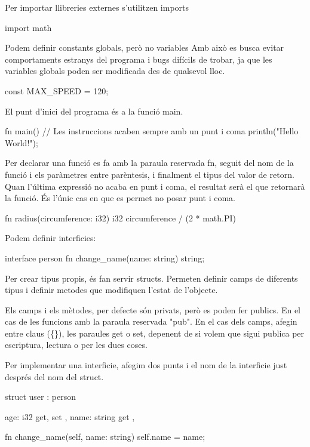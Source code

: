 ﻿\documentclass{article}
\begin{document}
Per importar llibreries externes s'utilitzen imports

\begin{code}
import math
\end{code}

Podem definir constants globals, però no variables
Amb això es busca evitar comportaments estranys del programa i bugs difícils
de trobar, ja que les variables globals poden ser modificada des de qualsevol
lloc.

\begin{code}
const MAX_SPEED = 120;
\end{code}

El punt d'inici del programa és a la funció main.

\begin{code}
fn main() {
    // Les instruccions acaben sempre amb un punt i coma
    println("Hello World!");
}
\end{code}

Per declarar una funció es fa amb la paraula reservada fn, seguit del nom de la 
funció i els paràmetres entre parèntesis, i finalment el tipus del valor de retorn.
Quan l'última expressió no acaba en punt i coma, el resultat serà el que retornarà
la funció. És l'únic cas en que es permet no posar punt i coma.

\begin{code}
fn radius(circumference: i32) i32 {
    circumference / (2 * math.PI)
}
\end{code}

Podem definir interficies:

\begin{code}
interface person {
    fn change_name(name: string) string;
}
\end{code}

Per crear tipus propis, és fan servir structs. Permeten definir camps de diferents
tipus i definir metodes que modifiquen l'estat de l'objecte. 

Els camps i els mètodes, per defecte són privats, però es poden fer publics.
En el cas de les funcions amb la paraula reservada "pub". En el cas dels camps,
afegin entre claus (\{\}), les paraules get o set, depenent de si volem que sigui publica
per escriptura, lectura o per les dues coses.

Per implementar una interficie, afegim dos punts i el nom de la interficie just 
després del nom del struct.

\begin{code}
struct user : person {
    age: i32 { get, set },
    name: string { get },

    fn change_name(self, name: string) {
        self.name = name;
    }
}
\end{code}
\end{document}
